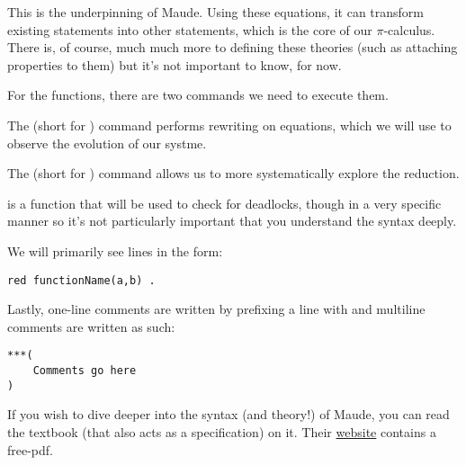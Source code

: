 This is the underpinning of Maude. Using these equations, it can transform existing statements into other statements, which is the core of our $\pi$-calculus. There is, of course, much much more to defining these theories (such as attaching properties to them) but it's not important to know, for now.

For the functions, there are two commands we need to execute them.

The  (short for ) command performs rewriting on equations, which we will use to observe the evolution of our systme.

The  (short for ) command allows us to more systematically explore the reduction. 

 is a function that will be used to check for deadlocks, though in a very specific manner so it's not particularly important that you understand the syntax deeply.

We will primarily see lines in the form:

\begin{verbatim}
red functionName(a,b) .
\end{verbatim}

Lastly, one-line comments are written by prefixing a line with \code{---} and multiline comments are written as such:
\begin{verbatim}
***(
    Comments go here
)
\end{verbatim}

If you wish to dive deeper into the syntax (and theory!) of Maude, you can read the textbook \cite{maude} (that also acts as a specification) on it. Their \href{http://maude.cs.illinois.edu/}{website} contains a free-pdf.